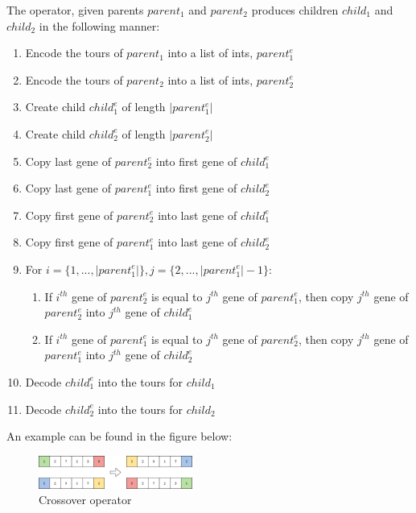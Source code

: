 \documentclass[conference]{IEEEtran}
\begin{document}
The operator, given parents $parent_{1}$ and $parent_{2}$ produces children $child_{1}$ and $child_{2}$ in the following manner:
\begin{enumerate}
    \item Encode the tours of $parent_{1}$ into a list of ints, $parent_{1}^{e}$
    \item Encode the tours of $parent_{2}$ into a list of ints, $parent_{2}^{e}$
    \item Create child $child_{1}^{e}$ of length $|parent_{1}^{e}|$
    \item Create child $child_{2}^{e}$ of length $|parent_{2}^{e}|$
    \item Copy last gene of $parent_{2}^{e}$ into first gene of $child_{1}^{e}$
    \item Copy last gene of $parent_{1}^{e}$ into first gene of $child_{2}^{e}$
    \item Copy first gene of $parent_{2}^{e}$ into last gene of $child_{1}^{e}$
    \item Copy first gene of $parent_{1}^{e}$ into last gene of $child_{2}^{e}$
    \item For $i = \{1, ..., |parent_{1}^{e}|\}, j = \{2, ..., |parent_{1}^{e}| - 1\}$:
    \begin{enumerate}
        \item If $i^{th}$ gene of $parent_{2}^{e}$ is equal to $j^{th}$ gene of $parent_{1}^{e}$, then copy $j^{th}$ gene of
        $parent_{2}^{e}$ into $j^{th}$ gene of $child_{1}^{e}$
        \item If $i^{th}$ gene of $parent_{1}^{e}$ is equal to $j^{th}$ gene of $parent_{2}^{e}$, then copy $j^{th}$ gene of
        $parent_{1}^{e}$ into $j^{th}$ gene of $child_{2}^{e}$
    \end{enumerate}
    \item Decode $child_{1}^{e}$ into the tours for $child_{1}$
    \item Decode $child_{2}^{e}$ into the tours for $child_{2}$
\end{enumerate}

An example can be found in the figure below:

\begin{figure}[h]
    \centering
    \includegraphics[width=0.45\textwidth]{images/crossover.png}
    \caption{Crossover operator}
\end{figure}
\end{document}
